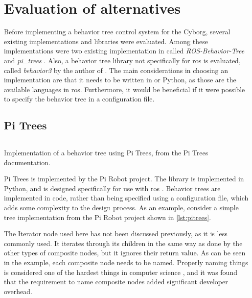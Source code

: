 \documentclass[\rootfolder/main.tex]{subfiles}
\begin{document}
\section{Evaluation of alternatives}

Before implementing a behavior tree control system for the Cyborg, several existing implementations and libraries were evaluated.
Among these implementations were two existing implementation in  called \emph{ROS-Behavior-Tree} \cite{Colledanchise} and \emph{pi\_trees} \cite{Goebel}.
Also, a behavior tree library not specifically for \acrshort{ros} is evaluated, called \emph{behavior3} by the author of \cite{Pereira2015}.
The main considerations in choosing an implementation are that it needs to be written in \CC or Python, as those are the available languages in \acrshort{ros}.
Furthermore, it would be beneficial if it were possible to specify the behavior tree in a configuration file.

\subsection{Pi Trees}

\begin{listing}
    \inputminted[fontsize=\scriptsize]{Python}{\rootfolder/Chapters/Chapter3/Listings/pitrees.py}
    \caption[Implementation of a behavior tree using Pi Trees]{Implementation of a behavior tree using Pi Trees, from the Pi Trees documentation.}
    \label{lst:pitrees}
\end{listing}

Pi Trees is implemented by the Pi Robot project.
The library is implemented in Python, and is designed specifically for use with \acrshort{ros} \cite{Goebel}.
Behavior trees are implemented in code, rather than being specified using a configuration file, which adds some complexity to the design process.
As an example, consider a simple tree implementation from the Pi Robot project \cite{PiRobot} shown in \cref{lst:pitrees}.

The Iterator node used here has not been discussed previously, as it is less commonly used.
It iterates through its children in the same way as done by the other types of composite nodes, but it ignores their return value.
As can be seen in the example, each composite node needs to be named.
Properly naming things is considered one of the hardest things in computer science \cite{Fowler}, and it was found that the requirement to name composite nodes added significant developer overhead.
\end{document}
